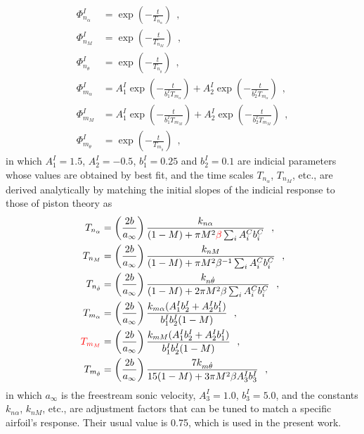\documentclass[12pt,a4paper,oneside,english]{abntex2} %
\newcommand{\fix}[1]{{\color{red}#1}}
\def\lp{\left(}
\def\rp{\right)}
\def\thetadot{\dot{\theta}}
\begin{document}
\begin{align}
    \Phi_{n_\alpha}^I &= \exp\lp-\frac{t}{T_{n_\alpha}}\rp \ \ ,
    \label{eq:Phi_n_alphA_I}
    \\
    \Phi_{n_M}^I &= \exp\lp-\frac{t}{T_{n_M}}\rp \ \ ,
    \label{eq:Phi_n_M_I}
    \\
    \Phi_{n_{\thetadot}}^I &= \exp\lp-\frac{t}{T_{n_{\thetadot}}}\rp \ \ ,
    \label{eq:Phi_n_thetadot_I}
    \\
    \Phi_{m_\alpha}^I &= A_1^I\exp\lp-\frac{t}{b_1^I T_{m_\alpha}}\rp + A_2^I\exp\lp-\frac{t}{b_2^I T_{m_\alpha}}\rp \ \ ,
    \label{eq:Phi_m_alphA_I}
    \\
    \Phi_{m_M}^I &= A_1^I\exp\lp-\frac{t}{b_1^I T_{m_M}}\rp + A_2^I\exp\lp-\frac{t}{b_2^I T_{m_M}}\rp \ \ ,
    \label{eq:Phi_m_M_I}
    \\
    \Phi_{m_{\thetadot}}^I &= \exp\lp-\frac{t}{T_{m_{\thetadot}}}\rp \ \ ,
    \label{eq:Phi_m_thetadot_I}
\end{align}
in which $A_1^I=1.5$, $A_2^I=-0.5$, $b_1^I=0.25$ and $b_2^I=0.1$ are indicial parameters whose values are obtained by best fit, and the time scales $T_{n_\alpha}$, $T_{n_{M}}$, etc., are derived analytically by matching the initial slopes of the indicial response to those of piston theory \cite{leishman1988,jose2005unsteady} as
\begin{align}
    T_{n_\alpha} &= \lp\frac{2b}{a_{\infty}}\rp\frac{k_{n\alpha}}{(1-M)+\pi M^2\fix{\beta}\sum_iA_i^Cb_i^C} \ \ ,
    \label{eq:T_n_alpha}
    \\
    T_{n_M} &=  \lp\frac{2b}{a_{\infty}}\rp\frac{k_{nM}}{(1-M)+\pi M^2\beta^{-1}\sum_iA_i^Cb_i^C} \ \ ,
    \label{eq:T_n_M}
    \\
    T_{n_{\thetadot}} &= \lp\frac{2b}{a_{\infty}}\rp\frac{k_{n\thetadot}}{(1-M)+2\pi M^2\beta\sum_iA_i^Cb_i^C} \ \ ,
    \label{eq:T_n_thetadot}
    \\
    T_{m_\alpha} &= \lp\frac{2b}{a_{\infty}}\rp\frac{k_{m\alpha}(A_1^Ib_2^I+A_2^Ib_1^I)}{b_1^Ib_2^I(1-M)} \ \ ,
    \label{eq:T_m_alpha}
    \\
    \fix{T_{m_M}} &= \lp\frac{2b}{a_{\infty}}\rp\frac{k_{mM}(A_1^Ib_2^I+A_2^Ib_1^I)}{b_1^Ib_2^I(1-M)} \ \ ,
    \label{eq:T_m_M}
    \\
    T_{m_{\thetadot}} &= \lp\frac{2b}{a_{\infty}}\rp\frac{7k_{m\thetadot}}{15(1-M)+3\pi M^2\beta A_3^Ib_3^I} \ \ ,
    \label{eq:T_m_thetadot}
\end{align}
in which $a_{\infty}$ is the freestream sonic velocity, $A_3^I=1.0$, $b_3^I=5.0$, and the constants $k_{n\alpha}$, $k_{nM}$, etc., are adjustment factors that can be tuned to match a specific airfoil's response. Their usual value is 0.75, which is used in the present work. 
\end{document}
